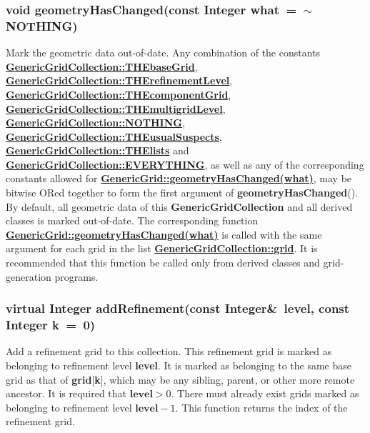 \documentclass{article}
\begin{document}
  \subsubsection{void geometryHasChanged(const Integer what~=~$\sim$NOTHING)}
  \label{GenericGridCollection::geometryHasChanged(what)}
    Mark the geometric data out-of-date.
    Any combination of the constants
    {\bf{}\hyperref{THEbaseGrid}{THEbaseGrid \rm(\S}{)}{GenericGridCollection::THEbaseGrid}},
    {\bf{}\hyperref{THErefinementLevel}{THErefinementLevel \rm(\S}{)}{GenericGridCollection::THErefinementLevel}},
    {\bf{}\hyperref{THEcomponentGrid}{THEcomponentGrid \rm(\S}{)}{GenericGridCollection::THEcomponentGrid}},
    {\bf{}\hyperref{THEmultigridLevel}{THEmultigridLevel \rm(\S}{)}{GenericGridCollection::THEmultigridLevel}},
    {\bf{}\hyperref{NOTHING}{NOTHING \rm(\S}{)}{GenericGridCollection::NOTHING}},
    {\bf{}\hyperref{THEusualSuspects}{THEusualSuspects \rm(\S}{)}{GenericGridCollection::THEusualSuspects}},
    {\bf{}\hyperref{THElists}{THElists \rm(\S}{)}{GenericGridCollection::THElists}} and
    {\bf{}\hyperref{EVERYTHING}{EVERYTHING \rm(\S}{)}{GenericGridCollection::EVERYTHING}},
    as well as any of the corresponding constants allowed for
    {\bf{}\hyperref{GenericGrid::geometryHasChanged(what)}{GenericGrid::geometryHasChanged(what) \rm(\S}{)}{GenericGrid::geometryHasChanged(what)}},
    may be bitwise ORed together to form the first argument of \textbf{geometryHasChanged}().
    By default, all geometric data of this \textbf{GenericGridCollection} and all derived classes is
    marked out-of-date.  The corresponding function
    {\bf{}\hyperref{geometryHasChanged(what)}{geometryHasChanged(what) \rm(\S}{)}{GenericGrid::geometryHasChanged(what)}}
    is called with the same argument for each grid in the list
    {\bf{}\hyperref{grid}{grid \rm(\S}{)}{GenericGridCollection::grid}}.
    It is recommended that this function be called only from derived classes and
    grid-generation programs.

  \subsubsection{virtual Integer addRefinement(const Integer\&~level, const Integer k~=~0)}
  \label{GenericGridCollection::addRefinement(level,k)}
    Add a refinement grid to this collection.  This refinement grid is marked as belonging to refinement level \textbf{level}.
    It is marked as belonging to the same base grid as that of \textbf{grid}[\textbf{k}], which may be any sibling, parent,
    or other more remote ancestor.  It is required that $\textbf{level}>0$.  There must already exist grids marked as belonging
    to refinement level $\textbf{level}-1$.  This function returns the index of the refinement grid.
\end{document}
